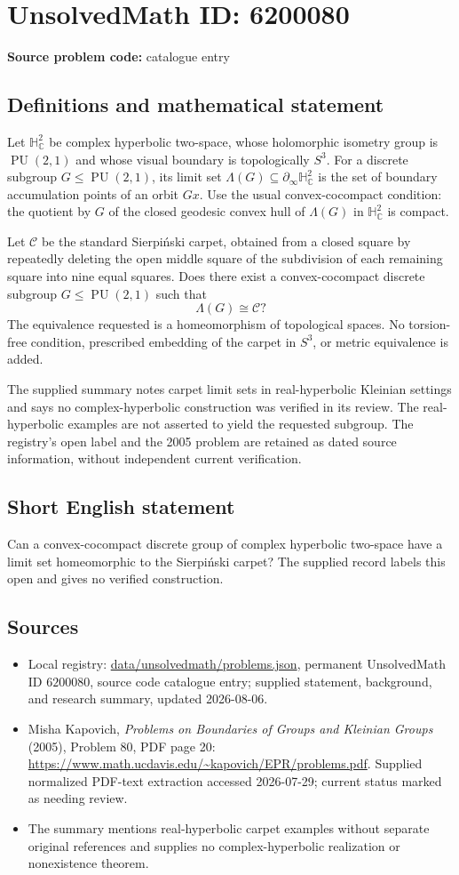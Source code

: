 \documentclass[11pt]{article}
\begin{document}
\section*{UnsolvedMath ID: 6200080}
\textbf{Source problem code:} catalogue entry
\subsection{Definitions and mathematical statement}
Let \(\mathbb H_{\mathbb C}^2\) be complex hyperbolic two-space, whose holomorphic isometry group is \(\operatorname{PU}(2,1)\) and whose visual boundary is topologically \(S^3\). For a discrete subgroup \(G\le\operatorname{PU}(2,1)\), its limit set \(\Lambda(G)\subseteq\partial_\infty\mathbb H_{\mathbb C}^2\) is the set of boundary accumulation points of an orbit \(Gx\). Use the usual convex-cocompact condition: the quotient by \(G\) of the closed geodesic convex hull of \(\Lambda(G)\) in \(\mathbb H_{\mathbb C}^2\) is compact.

Let \(\mathcal C\) be the standard Sierpi\'nski carpet, obtained from a closed square by repeatedly deleting the open middle square of the subdivision of each remaining square into nine equal squares. Does there exist a convex-cocompact discrete subgroup \(G\le\operatorname{PU}(2,1)\) such that
\[
 \Lambda(G)\cong\mathcal C?
\]
The equivalence requested is a homeomorphism of topological spaces. No torsion-free condition, prescribed embedding of the carpet in \(S^3\), or metric equivalence is added.

The supplied summary notes carpet limit sets in real-hyperbolic Kleinian settings and says no complex-hyperbolic construction was verified in its review. The real-hyperbolic examples are not asserted to yield the requested subgroup. The registry's open label and the 2005 problem are retained as dated source information, without independent current verification.
\subsection{Short English statement}
Can a convex-cocompact discrete group of complex hyperbolic two-space have a limit set homeomorphic to the Sierpi\'nski carpet? The supplied record labels this open and gives no verified construction.
\subsection{Sources}
\begin{itemize}
\item Local registry: \url{data/unsolvedmath/problems.json}, permanent UnsolvedMath ID \(6200080\), source code catalogue entry; supplied statement, background, and research summary, updated 2026-08-06.
\item Misha Kapovich, \emph{Problems on Boundaries of Groups and Kleinian Groups} (2005), Problem 80, PDF page 20: \url{https://www.math.ucdavis.edu/~kapovich/EPR/problems.pdf}. Supplied normalized PDF-text extraction accessed 2026-07-29; current status marked as needing review.
\item The summary mentions real-hyperbolic carpet examples without separate original references and supplies no complex-hyperbolic realization or nonexistence theorem.
\end{itemize}
\end{document}
